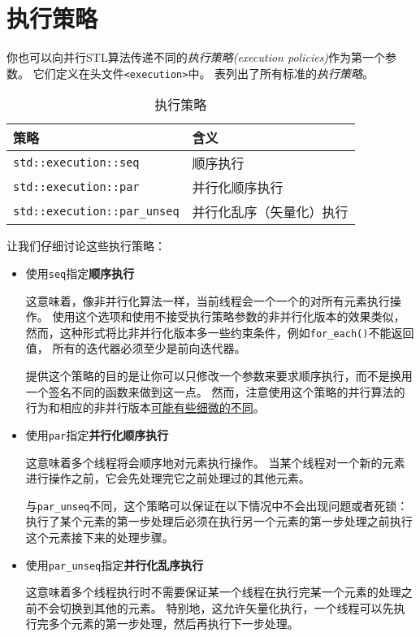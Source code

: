 \section{执行策略}\label{ch22.2}
你也可以向并行STL算法传递不同的\emph{执行策略(execution policies)}作为第一个参数。
它们定义在头文件\texttt{<execution>}中。
表列出了所有标准的\emph{执行策略}。
\begin{table}[htb]
    \centering
    \begin{tabular}{l|l}
        \hline
        \textbf{策略}                         & \textbf{含义}  \\
        \hline
        \texttt{std::execution::seq}        & 顺序执行         \\
        \texttt{std::execution::par}        & 并行化顺序执行      \\
        \texttt{std::execution::par\_unseq} & 并行化乱序（矢量化）执行 \\
        \hline
    \end{tabular}
    \caption{执行策略}
    \label{t22.1}
\end{table}

让我们仔细讨论这些执行策略：
\begin{itemize}
    \item 使用\texttt{seq}指定\textbf{顺序执行}

    这意味着，像非并行化算法一样，当前线程会一个一个的对所有元素执行操作。
    使用这个选项和使用不接受执行策略参数的非并行化版本的效果类似，
    然而，这种形式将比非并行化版本多一些约束条件，例如\texttt{for\_each()}不能返回值，
    所有的迭代器必须至少是前向迭代器。

    提供这个策略的目的是让你可以只修改一个参数来要求顺序执行，而不是换用一个签名不同的函数来做到这一点。
    然而，注意使用这个策略的并行算法的行为和相应的非并行版本\hyperref[ch22.4]{可能有些细微的不同}。

    \item 使用\texttt{par}指定\textbf{并行化顺序执行}

    这意味着多个线程将会顺序地对元素执行操作。
    当某个线程对一个新的元素进行操作之前，它会先处理完它之前处理过的其他元素。

    与\texttt{par\_unseq}不同，这个策略可以保证在以下情况中不会出现问题或者死锁：
    执行了某个元素的第一步处理后必须在执行另一个元素的第一步处理之前执行这个元素接下来的处理步骤。
    \item 使用\texttt{par\_unseq}指定\textbf{并行化乱序执行}

    这意味着多个线程执行时不需要保证某一个线程在执行完某一个元素的处理之前不会切换到其他的元素。
    特别地，这允许矢量化执行，一个线程可以先执行完多个元素的第一步处理，然后再执行下一步处理。
\end{itemize}

